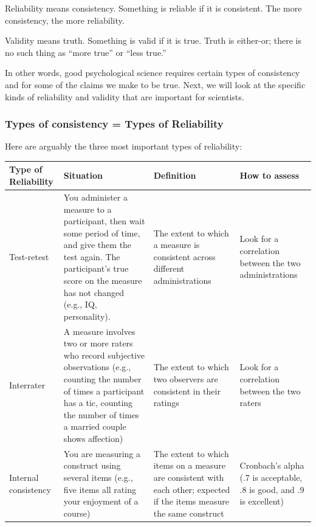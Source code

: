 \documentclass[
]{book}
\begin{document}
Reliability means consistency. Something is reliable if it is consistent. The more consistency, the more reliability.

Validity means truth. Something is valid if it is true. Truth is either-or; there is no such thing as ``more true'' or ``less true.''

In other words, good psychological science requires certain types of consistency and for some of the claims we make to be true. Next, we will look at the specific kinds of reliability and validity that are important for scientists.

\hypertarget{types-of-consistency-types-of-reliability}{%
\subsubsection{Types of consistency = Types of Reliability}\label{types-of-consistency-types-of-reliability}}

Here are arguably the three most important types of reliability:

\begin{longtable}[]{@{}
  >{\raggedright\arraybackslash}p{}
  >{\raggedright\arraybackslash}p{}
  >{\raggedright\arraybackslash}p{}
  >{\raggedright\arraybackslash}p{}@{}}
\toprule
Type of Reliability & Situation & Definition & How to assess \\
\midrule
\endhead
Test-retest & You administer a measure to a participant, then wait some period of time, and give them the test again. The participant's true score on the measure has not changed (e.g., IQ, personality). & The extent to which a measure is consistent across different administrations & Look for a correlation between the two administrations \\
Interrater & A measure involves two or more raters who record subjective observations (e.g., counting the number of times a participant has a tic, counting the number of times a married couple shows affection) & The extent to which two observers are consistent in their ratings & Look for a correlation between the two raters \\
Internal consistency & You are measuring a construct using several items (e.g., five items all rating your enjoyment of a course) & The extent to which items on a measure are consistent with each other; expected if the items measure the same construct & Cronbach's alpha (.7 is acceptable, .8 is good, and .9 is excellent) \\
\bottomrule
\end{longtable}
\end{document}
